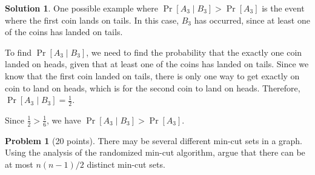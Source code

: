 \documentclass{article}
\theoremstyle{definition}
\newtheorem{problem}{Problem}
\newtheorem*{solution}{Solution}
\begin{document}
\begin{solution}
\noindent
One possible example where $\Pr[A_3 \mid B_3] > \Pr[A_3]$ is the event where the first coin lands on tails. In this case, $B_3$ has occurred, since at least one of the coins has landed on tails.

\noindent
To find $\Pr[A_3 \mid B_3]$, we need to find the probability that the exactly one coin landed on heads, given that at least one of the coins has landed on tails. Since we know that the first coin landed on tails, there is only one way to get exactly on coin to land on heads, which is for the second coin to land on heads. Therefore, $\Pr[A_3 \mid B_3] = \frac{1}{2}$.

\noindent
Since $\displaystyle\frac{1}{2}>\frac{1}{6}$, we have $\Pr[A_3 \mid B_3] > \Pr[A_3]$.
\end{solution}

\clearpage
\begin{problem}[20 points] 
  There may be several different min-cut sets in a graph. Using the
  analysis of the randomized min-cut algorithm, argue that there can
  be at most $n(n - 1)/2$ distinct min-cut sets.
\end{problem}
\end{document}

